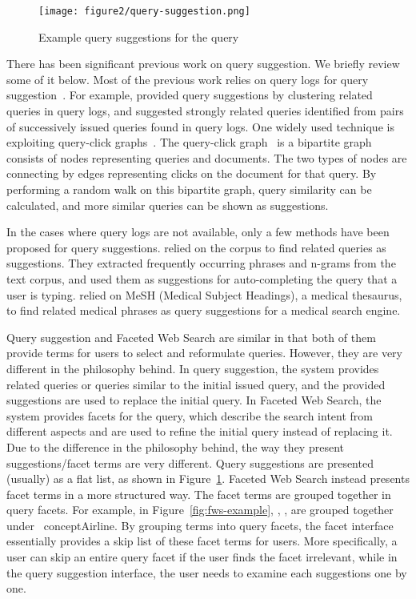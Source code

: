 \begin{figure}[!ht]
\centering
\texttt{[image: figure2/query-suggestion.png]}
\caption{Example query suggestions for the query }
\label{fig:bg-qsuggestion}
\end{figure}

There has been significant previous work on query suggestion. We briefly review some of it below. Most of the previous work relies on query logs for query suggestion~\cite{baeza2004query,jones2006generating,mei2008query,ozertem2011suggestion}. For example, \citet{baeza2004query} provided query suggestions by clustering related queries in query logs, and \citet{jones2006generating} suggested strongly related queries identified from pairs of successively issued queries found in query logs. One widely used technique is exploiting query-click graphs~\cite{craswell2007random,mei2008query,ozertem2011suggestion}. The query-click graph~\cite{craswell2007random} is a bipartite graph consists of nodes representing queries and documents. The two types of nodes are connecting by edges representing clicks on the document for that query. By performing a random walk on this bipartite graph, query similarity can be calculated, and more similar queries can be shown as suggestions. 

In the cases where query logs are not available, only a few methods have been proposed for query suggestions. \citet{bhatia2011query} relied on the corpus to find related queries as suggestions. They extracted frequently occurring phrases and n-grams from the text corpus, and used them as suggestions for auto-completing the query that a user is typing.  \citet{luo2008medsearch} relied on MeSH (Medical Subject Headings), a medical thesaurus, to find related medical phrases as query suggestions for a medical search engine.

Query suggestion and Faceted Web Search are similar in that both of them provide terms for users to select and reformulate queries. However, they are very different in the philosophy behind. In query suggestion, the system provides related queries or queries similar to the initial issued query, and the provided suggestions are used to replace the initial query. In Faceted Web Search, the system provides facets for the query, which describe the search intent from different aspects and are used to refine the initial query instead of replacing it. Due to the difference in the philosophy behind, the way they present suggestions/facet terms are very different. Query suggestions are presented (usually) as a flat list, as shown in Figure~\ref{fig:bg-qsuggestion}. Faceted Web Search instead presents facet terms in a more structured way. The facet terms are grouped together in query facets. For example, in Figure~\ref{fig:fws-example}, , ,  are grouped together under \
concept{Airline}. By grouping terms into query facets, the facet interface essentially provides a skip list of these facet terms for users. More specifically, a user can skip an entire query facet if the user finds the facet irrelevant, while in the query suggestion interface, the user needs to examine each suggestions one by one.

